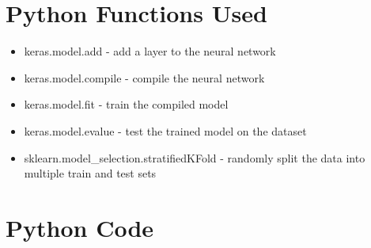\documentclass[12pt, a4paper]{article}
\begin{document}
\appendix
\section{Python Functions Used}
\begin{itemize}
\item keras.model.add - add a layer to the neural network
\item keras.model.compile - compile the neural network
\item keras.model.fit - train the compiled model
\item keras.model.evalue - test the trained model on the dataset
\item sklearn.model\_selection.stratifiedKFold - randomly split the data into multiple train and test sets
\end{itemize}
\section{Python Code}
\end{document}
